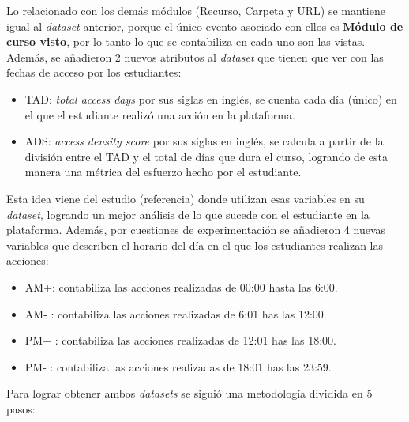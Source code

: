 Lo relacionado con los demás módulos (Recurso, Carpeta y URL) se mantiene igual al \textit{dataset} anterior, porque el único evento asociado con ellos es \textbf{Módulo de curso visto}, por lo tanto lo que se contabiliza en cada uno son las vistas. Además, se añadieron 2 nuevos atributos al \textit{dataset} que tienen que ver con las fechas de acceso por los estudiantes:
\begin{itemize}
    \item TAD: \textit{total access days} por sus siglas en inglés, se cuenta cada día (único) en el que el estudiante realizó una acción en la plataforma.
    \item ADS: \textit{access density score} por sus siglas en inglés, se calcula a partir de la división entre el TAD y el total de días que dura el curso, logrando de esta manera una métrica del esfuerzo hecho por el estudiante.
\end{itemize}

Esta idea viene del estudio (referencia) donde utilizan esas variables en su \textit{dataset}, logrando un mejor análisis de lo que sucede con el estudiante en la plataforma. Además, por cuestiones de experimentación se añadieron 4 nuevas variables que describen el horario del día en el que los estudiantes realizan las acciones: 

\begin{itemize}
    \item AM+: contabiliza las acciones realizadas de 00:00 hasta las 6:00.
    \item AM- : contabiliza las acciones realizadas de 6:01 has las 12:00.
    \item PM+ : contabiliza las acciones realizadas de 12:01 has las 18:00.
    \item PM- : contabiliza las acciones realizadas de 18:01 has las 23:59.
\end{itemize}

Para lograr obtener ambos \textit{datasets} se siguió una metodología dividida en 5 pasos:


